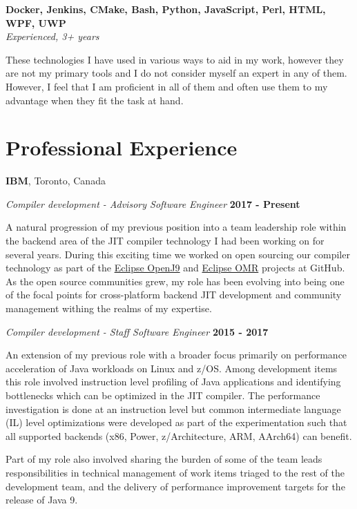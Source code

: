 \documentclass[margin,line]{res}
\begin{document}
\begin{resume}
{\bf Docker, Jenkins, CMake, Bash, Python, JavaScript, Perl, HTML, WPF, UWP } \\
{\em Experienced, 3+ years}

These technologies I have used in various ways to aid in my work, however they are not my primary tools and I do not
consider myself an expert in any of them. However, I feel that I am proficient in all of them and often use them to my
advantage when they fit the task at hand.

\section{\sc Professional Experience}
{\bf IBM}, Toronto, Canada

{\em Compiler development - Advisory Software Engineer} \hfill {\bf 2017 - Present}
\vspace{-.12in}

A natural progression of my previous position into a team leadership role within the backend area of the JIT compiler 
technology I had been working on for several years. During this exciting time we worked on open sourcing our compiler
technology as part of the \href{https://github.com/eclipse/openj9}{Eclipse OpenJ9} and 
\href{https://github.com/eclipse/omr}{Eclipse OMR} projects at GitHub. As the open source communities grew, my role has
been evolving into being one of the focal points for cross-platform backend JIT development and community management
withing the realms of my expertise.

{\em Compiler development - Staff Software Engineer} \hfill {\bf 2015 - 2017}
\vspace{-.12in}

An extension of my previous role with a broader focus primarily on performance acceleration of Java workloads on Linux
and z/OS. Among development items this role involved instruction level profiling of Java applications and identifying
bottlenecks which can be optimized in the JIT compiler. The performance investigation is done at an instruction level
but common intermediate language (IL) level optimizations were developed as part of the experimentation such that all
supported backends (x86, Power, z/Architecture, ARM, AArch64) can benefit.

\newpage

Part of my role also involved sharing the burden of some of the team leads responsibilities in technical management of
work items triaged to the rest of the development team, and the delivery of performance improvement targets for the
release of Java 9.


\end{resume}
\end{document}
